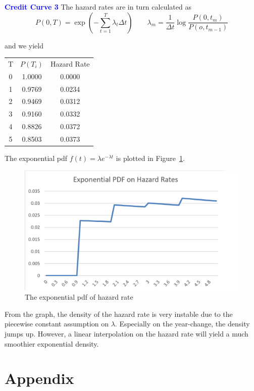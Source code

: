 \documentclass[a4paper,11pt] {article}
\begin{document}
\bigskip

\textcolor{blue}{\bf Credit Curve 3} The hazard rates are in turn calculated as
$$
P(0,T)=\exp\left( -\sum_{t=1}^T \lambda_t \Delta t \right) \qquad \lambda_m = \frac{1}{\Delta t} \log \frac{P(0,t_m)}{P(o,t_{m-1})}
$$

and we yield

\begin{center}
\begin{tabular}{|c|c|c|}
  \hline
T	&	$P(T_i)$	&	Hazard Rate	\\
0	&	1.0000	&	0.0000	\\
1	&	0.9769	&	0.0234	\\
2	&	0.9469	&	0.0312	\\
3	&	0.9160	&	0.0332	\\
4	&	0.8826	&	0.0372	\\
5	&	0.8503	&	0.0373	\\

  \hline
\end{tabular}
\end{center}

The exponential pdf $f(t)=\lambda e^{-\lambda t}$ is plotted in Figure~\ref{fig::pdf}.

\begin{center}
\begin{figure}
  \centering
  \includegraphics[scale=0.7]{epdf.png}
  \caption{The exponential pdf of hazard rate}\label{fig::pdf}
\end{figure}
\end{center}

From the graph, the density of the hazard rate is very instable due to the piecewise constant assumption on $\lambda$. Especially on the year-change, the density jumps up. However, a linear interpolation on the hazard rate will yield a much smoothier exponential density.

\section*{Appendix}
\begin{spacing}{0.9}






\end{spacing}
\end{document}
